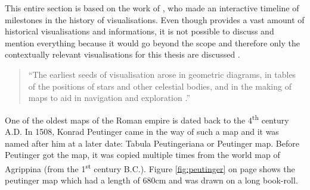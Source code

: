 This entire section is based on the work of \citeauthor{Friendly.2001}, who made an interactive timeline of milestones in the history of visualisations. Even though \citeauthor{Friendly.2001} provides a vast amount of historical visualisations and informations, it is not possible to discuss and mention everything because it would go beyond the scope and therefore only the contextually relevant visualisations for this thesis are discussed .

\begin{quote}
    ``The earliest seeds of visualisation arose in geometric diagrams, in tables of the positions of stars and other celestial bodies, and in the making of maps to aid in navigation and exploration .''
\end{quote}

One of the oldest maps of the Roman empire is dated back to the 4\textsuperscript{th} century A.D. In 1508, Konrad Peutinger came in the way of such a map and it was named after him at a later date: Tabula Peutingeriana or Peutinger map. Before Peutinger got the map, it was copied multiple times from the world map of Agrippina (from the 1\textsuperscript{st} century B.C.). Figure \ref{fig:peutinger} on page \pageref{fig:peutinger} shows the peutinger map which had a length of 680cm and was drawn on a long book-roll.

